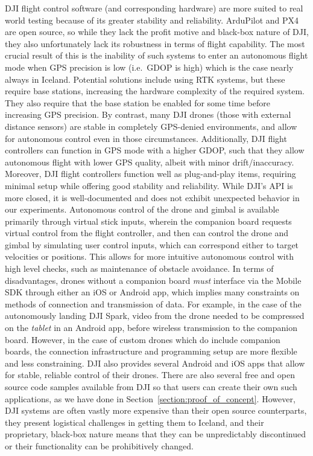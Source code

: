 DJI flight control software (and corresponding hardware) are more suited to real world testing
because of its greater stability and reliability.
ArduPilot and PX4 are open source, so while they lack the profit motive and black-box nature of DJI,
they also unfortunately lack its robustness in terms of flight capability.
The most crucial result of this is the inability of such systems to enter an autonomous flight mode
when GPS precision is low (i.e.~GDOP is high) which is the case nearly always in Iceland.
Potential solutions include using RTK systems, but these require base stations, increasing the hardware complexity
of the required system.
They also require that the base station be enabled for some time before increasing GPS precision.
By contrast, many DJI drones (those with external distance sensors) are stable in completely GPS-denied environments,
and allow for autonomous control even in those circumstances.
Additionally, DJI flight controllers can function in GPS mode with a higher GDOP,
such that they allow autonomous flight with lower GPS quality, albeit with minor drift/inaccuracy.
Moreover, DJI flight controllers function well as plug-and-play items,
requiring minimal setup while offering good stability and reliability.
While DJI's API is more closed, it is well-documented and does not exhibit unexpected behavior in our experiments.
Autonomous control of the drone and gimbal is available primarily through virtual stick inputs,
wherein the companion board requests virtual control from the flight controller,
and then can control the drone and gimbal by simulating user control inputs,
which can correspond either to target velocities or positions.
This allows for more intuitive autonomous control with high level checks, such as maintenance of obstacle avoidance.
In terms of disadvantages, drones without a companion board \textit{must} interface via the Mobile SDK through either an iOS or Android app,
which implies many constraints on methods of connection and transmission of data.
For example, in the case of the autonomously landing DJI Spark, video from the drone needed to be compressed on the \textit{tablet}
in an Android app, before wireless transmission to the companion board.
However, in the case of custom drones which do include companion boards, the connection infrastructure and programming setup are more flexible and less constraining.
DJI also provides several Android and iOS apps that allow for stable, reliable control of their drones.
There are also several free and open source code samples available from DJI so that users can create their own
such applications, as we have done in Section~\ref{section:proof_of_concept}.
However, DJI systems are often vastly more expensive than their open source counterparts,
they present logistical challenges in getting them to Iceland,
and their proprietary, black-box nature means that they can be unpredictably discontinued or their functionality can be prohibitively changed.

